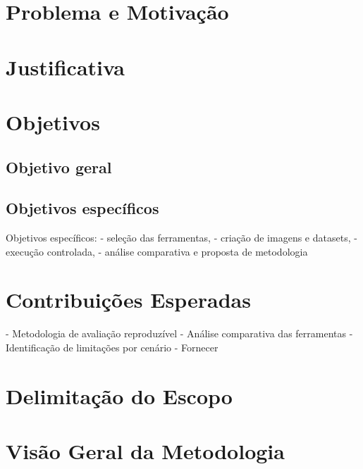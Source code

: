\documentclass[cic,diss,portuguese]{infufrgs}
\begin{document}
\section{Problema e Motivação}
 
\section{Justificativa}
 
\section{Objetivos}
\subsection{Objetivo geral}
\subsection{Objetivos específicos}
Objetivos específicos: 
  - seleção das ferramentas,
  - criação de imagens e datasets,
  - execução controlada,
  - análise comparativa e proposta de metodologia
 
\section{Contribuições Esperadas}
  - Metodologia de avaliação reproduzível
  - Análise comparativa das ferramentas
  - Identificação de limitações por cenário
  - Fornecer 
 
\section{Delimitação do Escopo}
 
\section{Visão Geral da Metodologia}
\end{document}

